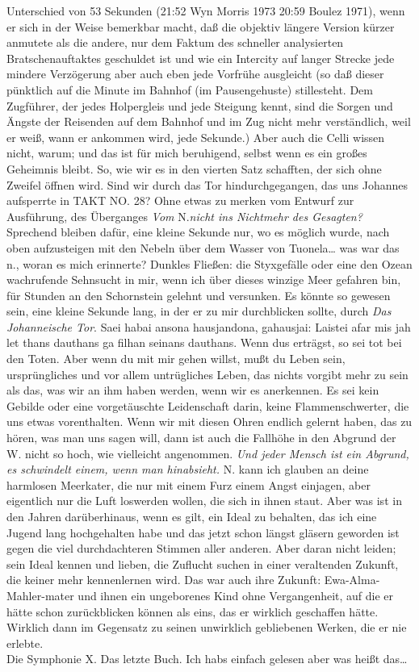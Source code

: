 \documentclass[
]{article}
\begin{document}
Unterschied von 53 Sekunden (21:52 Wyn Morris 1973 20:59 Boulez 1971),
wenn er sich in der Weise bemerkbar macht, daß die objektiv längere
Version kürzer anmutete als die andere, nur dem Faktum des schneller
analysierten Bratschenauftaktes geschuldet ist und wie ein Intercity auf
langer Strecke jede mindere Verzögerung aber auch eben jede Vorfrühe
ausgleicht (so daß dieser pünktlich auf die Minute im Bahnhof (im
Pausengehuste) stillesteht. Dem Zugführer, der jedes Holpergleis und
jede Steigung kennt, sind die Sorgen und Ängste der Reisenden auf dem
Bahnhof und im Zug nicht mehr verständlich, weil er weiß, wann er
ankommen wird, jede Sekunde.) Aber auch die Celli wissen nicht, warum;
und das ist für mich beruhigend, selbst wenn es ein großes Geheimnis
bleibt. So, wie wir es in den vierten Satz schafften, der sich ohne
Zweifel öffnen wird. Sind wir durch das Tor hindurchgegangen, das uns
Johannes aufsperrte in TAKT NO. 28? Ohne etwas zu merken vom Entwurf zur
Ausführung, des Überganges \emph{Vom }N.\emph{nicht ins Nichtmehr des
Gesagten?} Sprechend bleiben dafür, eine kleine Sekunde nur, wo es
möglich wurde, nach oben aufzusteigen mit den Nebeln über dem Wasser von
Tuonela\ldots{} was war das n., woran es mich erinnerte? Dunkles
Fließen: die Styxgefälle oder eine den Ozean wachrufende Sehnsucht in
mir, wenn ich über dieses winzige Meer gefahren bin, für Stunden an den
Schornstein gelehnt und versunken. Es könnte so gewesen sein, eine
kleine Sekunde lang, in der er zu mir durchblicken sollte, durch
\emph{Das Johanneische Tor}. Saei habai ansona hausjandona, gahausjai:
Laistei afar mis jah let thans dauthans ga filhan seinans dauthans. Wenn
du\textquotesingle s erträgst, so sei tot bei den Toten. Aber wenn du
mit mir gehen willst, mußt du Leben sein, ursprüngliches und vor allem
untrügliches Leben, das nichts vorgibt mehr zu sein als das, was wir an
ihm haben werden, wenn wir es anerkennen. Es sei kein Gebilde oder eine
vorgetäuschte Leidenschaft darin, keine Flammenschwerter, die uns etwas
vorenthalten. Wenn wir mit diesen Ohren endlich gelernt haben, das zu
hören, was man uns sagen will, dann ist auch die Fallhöhe in den Abgrund
der W. nicht so hoch, wie vielleicht angenommen. \emph{Und jeder Mensch
ist ein Abgrund, es schwindelt einem, wenn man hinabsieht.} N. kann ich
glauben an deine harmlosen Meerkater, die nur mit einem Furz einem Angst
einjagen, aber eigentlich nur die Luft loswerden wollen, die sich in
ihnen staut. Aber was ist in den Jahren darüberhinaus, wenn es gilt, ein
Ideal zu behalten, das ich eine Jugend lang hochgehalten habe und das
jetzt schon längst gläsern geworden ist gegen die viel durchdachteren
Stimmen aller anderen. Aber daran nicht leiden; sein Ideal kennen und
lieben, die Zuflucht suchen in einer veraltenden Zukunft, die keiner
mehr kennenlernen wird. Das war auch ihre Zukunft: Ewa-Alma-Mahler-mater
und ihnen ein ungeborenes Kind ohne Vergangenheit, auf die er hätte
schon zurückblicken können als eins, das er wirklich geschaffen hätte.
Wirklich dann im Gegensatz zu seinen unwirklich gebliebenen Werken, die
er nie erlebte.\\
Die Symphonie X. Das letzte Buch. Ich habs einfach gelesen aber was
heißt das\ldots{}
\end{document}
